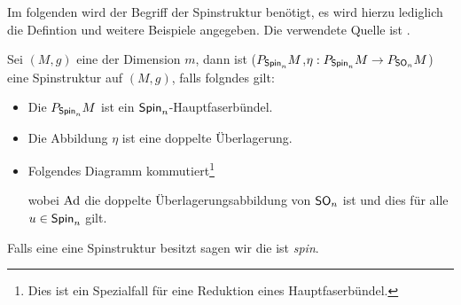 Im folgenden wird der Begriff der Spinstruktur benötigt, es wird
hierzu lediglich die Defintion und weitere Beispiele angegeben.
Die verwendete Quelle ist \cite{BHMMM15}.

\begin{Def}[Spinstruktur]
	Sei $(M,g)$ eine \RMF der Dimension $m$, dann ist
	 ($P_{\operatorname{\sf Spin}_{ n }}M$,$\eta : P_{\operatorname{\sf Spin}_{ n }}M \rightarrow P_{\operatorname{\sf SO}_{ n }}M$) eine Spinstruktur auf $(M,g)$, falls folgndes gilt:
	 \begin{itemize}
	 	\item Die \mfg $P_{\operatorname{\sf Spin}_{ n }}M$ ist ein $\operatorname{\sf Spin}_{ n }$-Hauptfaserbündel.
	 	\item Die Abbildung $\eta$ ist eine doppelte Überlagerung.
	 	\item Folgendes Diagramm kommutiert\footnote{Dies ist ein Spezialfall für eine Reduktion eines Hauptfaserbündel.}\\
		 	\begin{center}
			 \end{center}
			wobei $\operatorname{Ad}$ die doppelte Überlagerungsabbildung von $\operatorname{\sf SO}_{ n }$ ist
			und dies für alle $u \in \operatorname{\sf Spin}_{ n }$ gilt.
	 \end{itemize}
	 Falls eine \RMF eine Spinstruktur besitzt sagen wir die \mfg ist \textit{spin}.
	

\end{Def}

